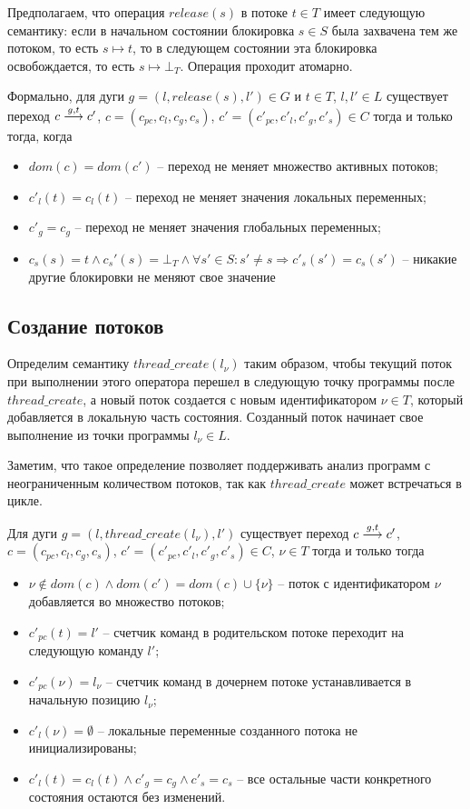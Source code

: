 Предполагаем, что операция $release(s)$ в потоке $t \in T$ имеет следующую семантику:
если в начальном состоянии блокировка $s \in S$ была захвачена тем же потоком, то есть $s \mapsto t$, то в следующем состоянии эта блокировка освобождается, то есть $s \mapsto \bot_T$. Операция проходит атомарно.

Формально, для дуги $g = (l, release(s), l')\in G$ и $t\in T$, $l, l' \in L$ существует переход
$c \stackrel{g, t}{\longrightarrow} c'$, $c=(c_{pc}, c_l, c_g, c_s)$, $c'=(c'_{pc}, c'_l, c'_g, c'_s) \in C$ тогда и только тогда, когда 
\begin{itemize}
\item $dom(c)=dom(c')$ -- переход не меняет множество активных потоков;
\item $c'_l(t)=c_l(t)$ -- переход не меняет значения локальных переменных;
\item $c'_g = c_g$ -- переход не меняет значения глобальных переменных;
\item $c_s(s)=t \land c_s'(s)=\bot_T \land \forall s'\in S: s'\neq s \Rightarrow c'_s(s')=c_s(s')$ -- никакие другие блокировки не меняют свое значение
\end{itemize}

\subsection{Создание потоков}
Определим семантику $thread\_create(l_\nu)$ таким образом, чтобы текущий поток при выполнении этого оператора перешел в следующую точку программы после $thread\_create$, а новый поток создается с новым идентификатором $\nu \in T$, который добавляется в локальную часть состояния.
Созданный поток начинает свое выполнение из точки программы $l_\nu \in L$.

Заметим, что такое определение позволяет поддерживать анализ программ с неограниченным количеством потоков, так как $thread\_create$ может встречаться в цикле.

Для дуги $g = (l, thread\_create(l_\nu), l')$ существует переход
$c \stackrel{g, t}{\longrightarrow} c'$, $c=(c_{pc}, c_l, c_g, c_s)$, $c'=(c'_{pc}, c'_l, c'_g, c'_s) \in C$, $\nu \in T$ тогда и только тогда
\begin{itemize}
\item $\nu \notin dom(c) \land dom(c') = dom(c) \cup \{ \nu\}$ -- поток с идентификатором $\nu$ добавляется во множество потоков;
\item $c'_{pc}(t)=l'$ -- счетчик команд в родительском потоке переходит на следующую команду $l'$;
\item $c'_{pc}(\nu)=l_\nu$ --  счетчик команд в дочернем потоке устанавливается в начальную позицию $l_\nu$;
\item $c'_l(\nu)=\emptyset$ -- локальные переменные созданного потока не инициализированы;
\item $c'_l(t)=c_l(t) \land c'_g = c_g \land c'_s = c_s$ -- все остальные части конкретного состояния остаются без изменений.
\end{itemize}

